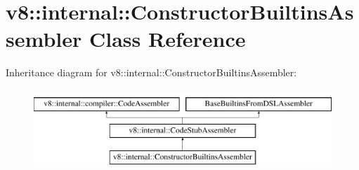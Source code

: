 \hypertarget{classv8_1_1internal_1_1ConstructorBuiltinsAssembler}{}\section{v8\+:\+:internal\+:\+:Constructor\+Builtins\+Assembler Class Reference}
\label{classv8_1_1internal_1_1ConstructorBuiltinsAssembler}
Inheritance diagram for v8\+:\+:internal\+:\+:Constructor\+Builtins\+Assembler\+:\begin{figure}[H]
\begin{center}
\leavevmode
\includegraphics[height=3.000000cm]{classv8_1_1internal_1_1ConstructorBuiltinsAssembler}
\end{center}
\end{figure}
